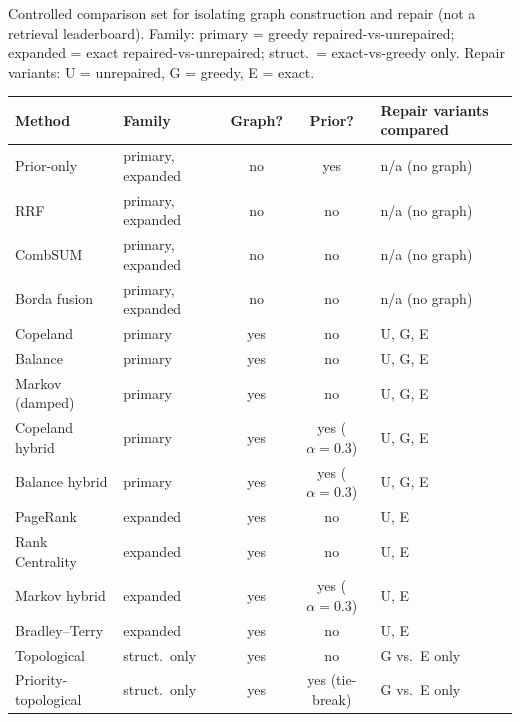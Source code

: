 \begin{supplementtable}
  \caption{Controlled comparison set for isolating graph construction and
    repair (not a retrieval leaderboard). Family: primary = greedy
    repaired-vs-unrepaired; expanded = exact repaired-vs-unrepaired;
    struct.\ = exact-vs-greedy only. Repair variants: U = unrepaired,
    G = greedy, E = exact.}
  \label{tab:baselines}
  \sncstable\renewcommand{\arraystretch}{1.25}
  \begin{tabularx}{\linewidth}{@{}lYccY@{}}
    \toprule
    Method & Family & Graph? & Prior? & Repair variants compared \\
    \midrule
    Prior-only & primary, expanded & no & yes & n/a (no graph) \\
    \addlinespace
    RRF & primary, expanded & no & no & n/a (no graph) \\
    \addlinespace
    CombSUM & primary, expanded & no & no & n/a (no graph) \\
    \addlinespace
    Borda fusion & primary, expanded & no & no & n/a (no graph) \\
    \addlinespace
    Copeland & primary & yes & no & U, G, E \\
    \addlinespace
    Balance & primary & yes & no & U, G, E \\
    \addlinespace
    Markov (damped) & primary & yes & no & U, G, E \\
    \addlinespace
    Copeland hybrid & primary & yes & yes ($\alpha{=}0.3$) & U, G, E \\
    \addlinespace
    Balance hybrid & primary & yes & yes ($\alpha{=}0.3$) & U, G, E \\
    \addlinespace
    PageRank & expanded & yes & no & U, E \\
    \addlinespace
    Rank Centrality & expanded & yes & no & U, E \\
    \addlinespace
    Markov hybrid & expanded & yes & yes ($\alpha{=}0.3$) & U, E \\
    \addlinespace
    Bradley--Terry & expanded & yes & no & U, E \\
    \addlinespace
    Topological & struct.\ only & yes & no & G vs.\ E only \\
    \addlinespace
    Priority-topological & struct.\ only & yes & yes (tie-break) & G vs.\ E only \\
    \bottomrule
  \end{tabularx}
\end{supplementtable}